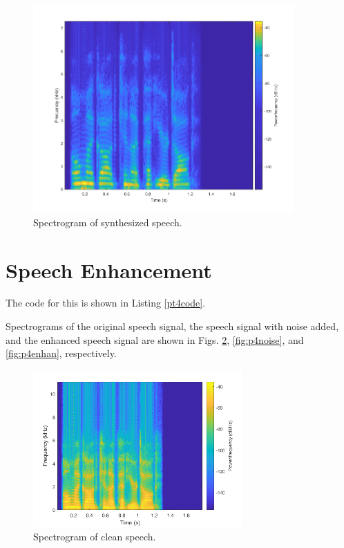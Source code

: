 \documentclass[letterpaper]{article}
\begin{document}
\begin{figure}[h!]
    \centering
    \includegraphics[width=10cm]{ee599hw5p3}
    \caption{Spectrogram of synthesized speech.}
    \label{fig:spec}
\end{figure}


\section{Speech Enhancement}

The code for this is shown in Listing \ref{pt4code}.



Spectrograms of the original speech signal, the speech signal with noise added, and the enhanced speech signal are shown in Figs. \ref{fig:p4clean}, \ref{fig:p4noise}, and \ref{fig:p4enhan}, respectively.

\begin{figure}[h!]
    \centering
    \includegraphics[width=8cm]{ee599hw5p4-1.png}
    \caption{Spectrogram of clean speech.}
    \label{fig:p4clean}
\end{figure}
\end{document}
